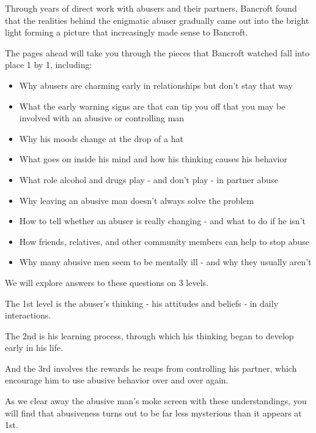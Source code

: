 \documentclass[oneside]{article}
\numberwithin{equation}{section}
\begin{document}

%
Through years of direct work with abusers and their partners, Bancroft found that the realities behind the enigmatic abuser gradually came out into the bright light forming a picture that increasingly made sense to Bancroft.

The pages ahead will take you through the pieces that Bancroft watched fall into place 1 by 1, including:
\begin{itemize}
    \item Why abusers are charming early in relationships but don't stay that way
    \item What the early warning signs are that can tip you off that you may be involved with an abusive or controlling man
    \item Why his moods change at the drop of a hat
    \item What goes on inside his mind and how his thinking causes his behavior
    \item What role alcohol and drugs play - and don't play - in partner abuse
    \item Why leaving an abusive man doesn't always solve the problem
    \item How to tell whether an abuser is really changing - and what to do if he isn't
    \item How friends, relatives, and other community members can help to stop abuse
    \item Why many abusive men seem to be mentally ill - and why they usually aren't
\end{itemize}
We will explore answers to these questions on 3 levels.

The 1st level is the abuser's thinking - his attitudes and beliefs - in daily interactions.

The 2nd is his learning process, through which his thinking began to develop early in his life.

And the 3rd involves the rewards he reaps from controlling his partner, which encourage him to use abusive behavior over and over again.

As we clear away the abusive man's moke screen with these understandings, you will find that abusiveness turns out to be far less mysterious than it appears at 1st.

%
\end{document}

